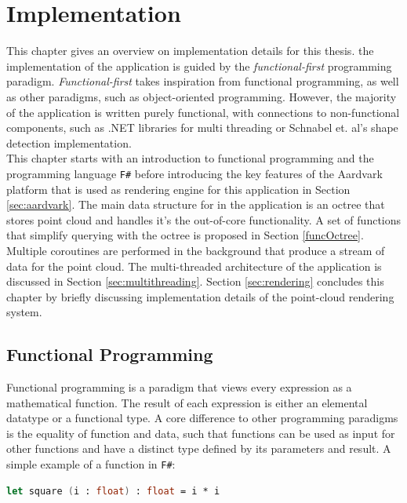 \chapter{Implementation}
\label{chap:implementation}

This chapter gives an overview on implementation details for this thesis. the implementation of the application is guided by the \textit{functional-first} programming paradigm. \textit{Functional-first} takes inspiration from functional programming, as well as other paradigms, such as object-oriented programming. However, the majority of the application is written purely functional, with connections to non-functional components, such as .NET libraries for multi threading or Schnabel et. al's shape detection implementation\cite{schnabel-2007-software}. 
\\
This chapter starts with an introduction to functional programming and the programming language \verb|F#|\cite{FSharp} before introducing the key features of the Aardvark platform\cite{aardvark} that is used as rendering engine for this application in Section \ref{sec:aardvark}. The main data structure for in the application is an octree that stores point cloud and handles it's the out-of-core functionality. A set of functions that simplify querying with the octree is proposed in Section \ref{funcOctree}. 
\\
Multiple coroutines are performed in the background that produce a stream of data for the point cloud. The multi-threaded architecture of the application is discussed in Section \ref{sec:multithreading}. Section \ref{sec:rendering} concludes this chapter by briefly discussing implementation details of the point-cloud rendering system. 


\section{Functional Programming}
\label{sec:funprog}

Functional programming is a paradigm that views every expression as a mathematical function. The result of each expression is either an elemental datatype or a functional type. A core difference to other programming paradigms is the equality of function and data, such that functions can be used as input for other functions and have a distinct type defined by its parameters and result. A simple example of a function in \verb|F#|: 

\begin{lstlisting}[language=FSharp]
let square (i : float) : float = i * i 
\end{lstlisting}

